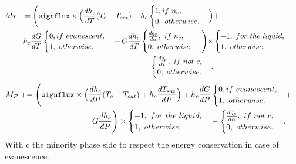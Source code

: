 \begin{equation}
\begin{aligned}
    M_T \pluseq \Bigg(\texttt{signflux}\times \Big(\frac{dh_c}{dT}(T_c-T_{sat})+h_c\begin{cases} 1, if\ n_c,\\ 0,\ otherwise. \end{cases}\Big)& + & \\h_c\frac{dG}{dT}\begin{cases} 0, if\ evanescent,\\ 1,\ otherwise. \end{cases} + G\frac{dh_c}{dT}\begin{cases} \frac{dq_p}{d\alpha},\ if\ n_c, \\ 0,\ otherwise. \end{cases}\Bigg)\times &\begin{cases} -1,\ for\ the\ liquid, \\ 1,\ otherwise. \end{cases}& \\ - \begin{cases} \frac{dq_p}{dT},\ if\ not\ c, \\ 0,\ otherwise. \end{cases}.
\end{aligned}
\end{equation}
\begin{equation}
\begin{aligned}
    M_P \pluseq \Bigg(\texttt{signflux}\times \Big(\frac{dh_c}{dP}(T_c-T_{sat})+h_c\frac{dT_{sat}}{dP}\Big)+h_c\frac{dG}{dP}\begin{cases} 0, if\ evanescent,\\ 1,\ otherwise. \end{cases}& +& \\G\frac{dh_c}{dP}\Bigg)\times \begin{cases} -1,\ for\ the\ liquid, \\ 1,\ otherwise. \end{cases}-\begin{cases} \frac{dq_p}{d\alpha},\ if\ not\ c, \\ 0,\ otherwise. \end{cases}.
\end{aligned}
\end{equation}
With c the minority phase side to respect the energy conservation in case of evanescence.

